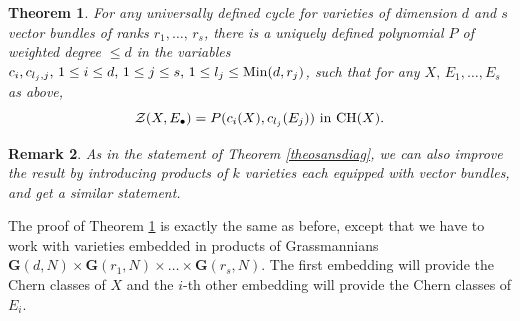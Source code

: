 \documentclass[10pt]{article}
\newtheorem{theo}{Theorem}[section]
\newtheorem{rema}[theo]{Remark}
\begin{document}
\begin{theo}\label{theovariant} For any universally defined cycle for  varieties of dimension $d$ and
$s$ vector bundles of ranks $r_1,\ldots,\,r_s$, there is  a uniquely defined
polynomial $P$ of weighted degree $\leq d$ in the variables
$c_i, c_{l_j,j},\,1\leq i\leq d,\, 1\leq j\leq s,\,1\leq l_j \leq {\rm Min}(d,r_j)$, such that
for any $X,\,E_1,\ldots, E_s$ as above,
$$\mathcal{Z}(X,E_\bullet)=P(c_i(X), c_{l_j}(E_j))\,\,{\rm in}\,\,{\rm CH}(X).$$
\end{theo}
\begin{rema} {\rm As in the statement of Theorem \ref{theosansdiag}, we can also improve the result by introducing products
of $k$ varieties each equipped with  vector bundles, and get a similar statement}.
\end{rema}
The proof of Theorem \ref{theovariant} is exactly the same as before, except that we have to work with
 varieties embedded in
products of Grassmannians $\mathbf{G}(d, N)\times \mathbf{G}(r_1,N)\times\ldots\times \mathbf{G}(r_s,N)$. The first embedding
will provide the Chern classes of $X$ and the $i$-th other embedding will provide  the Chern classes of $E_i$.
\end{document}
